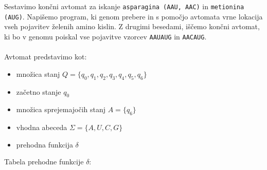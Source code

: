 \documentclass[a4paper,11pt]{article}
\begin{document}
Sestavimo končni avtomat za iskanje \texttt{asparagina (AAU, AAC)} in \texttt{metionina (AUG)}. 
Napišemo program, ki genom prebere in s pomočjo avtomata vrne lokacija vseh pojavitev želenih amino kislin.
Z drugimi besedami, iščemo končni avtomat, ki bo v genomu poiskal vse pojavitve vzorcev \texttt{AAUAUG} in \texttt{AACAUG}.
\\
\\
Avtomat predstavimo kot:
\begin{itemize}
    \item množica stanj $Q = \{ q_0, q_1, q_2, q_3, q_4, q_5, q_6 \}$
    \item začetno stanje $q_0$
    \item množica sprejemajočih stanj $A = \{ q_6 \}$
    \item vhodna abeceda $ \Sigma = \{ A, U, C, G\}$
    \item prehodna funkcija $ \delta$
\end{itemize}

\noindent
Tabela prehodne funkcije $ \delta$:
\\

\begin{table}[ht!]
    \begin{center}
    \end{center}
\end{table}
\end{document}
